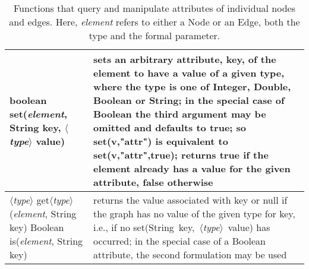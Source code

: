 \begin{table}
  \small
  \centering
  \begin{tabular}{| m{} | m{} |}
    \hline
    \textsf{boolean set(\emph{element}, String key, $\langle$\emph{type}$\rangle$ value)}
    &
    sets an arbitrary attribute, \textsf{key}, of the element to have a value of a given type, where
    the type is one of \textsf{Integer}, \textsf{Double}, \textsf{Boolean}
    or \textsf{String};
    in the special case of \textsf{Boolean} the third argument may be omitted
    and defaults to \textsf{true};
    so \textsf{set(v,"attr")} is equivalent to \textsf{set(v,"attr",true)};
    returns \textsf{true} if the element already has a value for the given attribute,
    \textsf{false} otherwise
    \\ \hline
    \shortstack[l]{
    \textsf{$\langle$\emph{type}$\rangle$ get$\langle$\emph{type}$\rangle$(\emph{element}, String key)}\\
    \textsf{Boolean is(\emph{element}, String key)}
    }
    &
    returns the value associated with \textsf{key} or \textsf{null}
    if the graph has no value of the given type for \textsf{key}, i.e.,
    if no
    \textsf{set(String~key,~$\langle$\emph{type}$\rangle$~value)} has occurred;
    in the special case of a \textsf{Boolean} attribute, the second formulation
    may be used
    \\ \hline
  \end{tabular}

  \caption{Functions that query and manipulate attributes of individual
    nodes and edges.
    Here, \emph{element} refers to either a \textsf{Node} or an \textsf{Edge},
    both the type and the formal parameter.
  }
  \label{tab:graph_element_functions}
\end{table}
